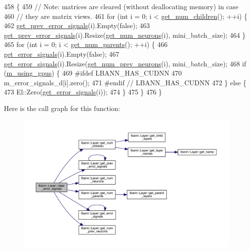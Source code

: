 \begin{DoxyCode}
458                                                    \{
459   \textcolor{comment}{// Note: matrices are cleared (without deallocating memory) in case}
460   \textcolor{comment}{// they are matrix views.}
461   \textcolor{keywordflow}{for} (\textcolor{keywordtype}{int} i = 0; i < \hyperlink{classlbann_1_1Layer_a1409a117c31a7ea4f2c7a4d22a3e86c3}{get\_num\_children}(); ++i) \{
462     \hyperlink{classlbann_1_1Layer_a7ac4579d3c1671dfaf86e3b618d6938a}{get\_prev\_error\_signals}(i).Empty(\textcolor{keyword}{false});
463     \hyperlink{classlbann_1_1Layer_a7ac4579d3c1671dfaf86e3b618d6938a}{get\_prev\_error\_signals}(i).Resize(\hyperlink{classlbann_1_1Layer_aa4de686cc6c2dd38166f42faf874f227}{get\_num\_neurons}(i), 
      mini\_batch\_size);
464   \}
465   \textcolor{keywordflow}{for} (\textcolor{keywordtype}{int} i = 0; i < \hyperlink{classlbann_1_1Layer_ac9290d4a6453ccda5f6b4d8b57b49ba3}{get\_num\_parents}(); ++i) \{
466     \hyperlink{classlbann_1_1Layer_adb561e140e0bb601f3c5a8ee053a71d2}{get\_error\_signals}(i).Empty(\textcolor{keyword}{false});
467     \hyperlink{classlbann_1_1Layer_adb561e140e0bb601f3c5a8ee053a71d2}{get\_error\_signals}(i).Resize(\hyperlink{classlbann_1_1Layer_a27112eb70bbfbd7f3c3e749960400dec}{get\_num\_prev\_neurons}(i), 
      mini\_batch\_size);
468     \textcolor{keywordflow}{if} (\hyperlink{classlbann_1_1Layer_af7881cb5eff5207c15fa835d65462e8f}{m\_using\_gpus}) \{
469 \textcolor{preprocessor}{#ifdef LBANN\_HAS\_CUDNN}
470       m\_error\_signals\_d[i].zero();
471 \textcolor{preprocessor}{#endif // LBANN\_HAS\_CUDNN}
472     \} \textcolor{keywordflow}{else} \{
473       El::Zero(\hyperlink{classlbann_1_1Layer_adb561e140e0bb601f3c5a8ee053a71d2}{get\_error\_signals}(i));
474     \}
475   \}
476 \}
\end{DoxyCode}
Here is the call graph for this function\+:\nopagebreak
\begin{figure}[H]
\begin{center}
\leavevmode
\includegraphics[width=350pt]{classlbann_1_1Layer_aa1389a70b804debaac6953b3b1147593_cgraph}
\end{center}
\end{figure}
